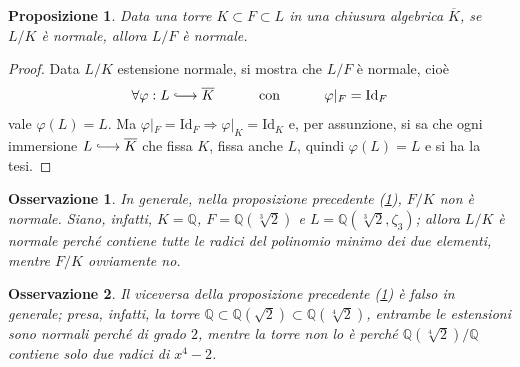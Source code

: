 \documentclass[12pt]{scrartcl}
\theoremstyle{style}
\newtheorem{prop}{Proposizione}[section]
\newtheorem{osservazione}{Osservazione}[section]
\numberwithin{equation}{subsection}
\newcommand{\longhookrightarrow}{\lhook\joinrel\longrightarrow}
\begin{document}
\begin{prop}\label{normtor}
	Data una torre $K \subset F \subset L$ in una chiusura algebrica $\overline{K}$, se $L / K$ \`e normale, allora $L / F$ \`e normale.
\end{prop}
\begin{proof}
	Data $L / K$ estensione normale, si mostra che $L / F$ \`e normale, cio\`e 
	\[
	\forall \varphi : L \longhookrightarrow \overline{K} \hspace{1cm}\text{ con }\hspace{1cm} \varphi |_F = \mathrm{Id} _F
	\] 
	vale $\varphi (L) = L$.
	Ma $\varphi |_F = \mathrm{Id} _F \Rightarrow \varphi |_K = \mathrm{Id} _K$ e, per assunzione, si sa che ogni immersione $L \longhookrightarrow \overline{K}$ che fissa $K$, fissa anche $L$, quindi $\varphi (L) = L$ e si ha la tesi.
\end{proof}
\begin{osservazione}
	In generale, nella proposizione precedente (\ref{normtor}), $F / K$ non \`e normale.
	Siano, infatti, $K = \mathbb{Q}$, $F = \mathbb{Q}(\sqrt[3]{2} )$ e $L = \mathbb{Q}(\sqrt[3]{2}, \zeta_3) $; allora $L / K$ \`e normale perch\'e contiene tutte le radici del polinomio minimo dei due elementi, mentre $F / K$ ovviamente no.
\end{osservazione}
\begin{osservazione}
	Il viceversa della proposizione precedente (\ref{normtor}) \`e falso in generale; presa, infatti, la torre $\mathbb{Q} \subset  \mathbb{Q}(\sqrt{2} ) \subset \mathbb{Q}(\sqrt[4]{2}) $, entrambe le estensioni sono normali perch\'e di grado $2$, mentre la torre non lo \`e perch\'e $\mathbb{Q}(\sqrt[4]{2}) / \mathbb{Q} $ contiene solo due radici di $x^4 - 2$.
\end{osservazione}
\end{document}
